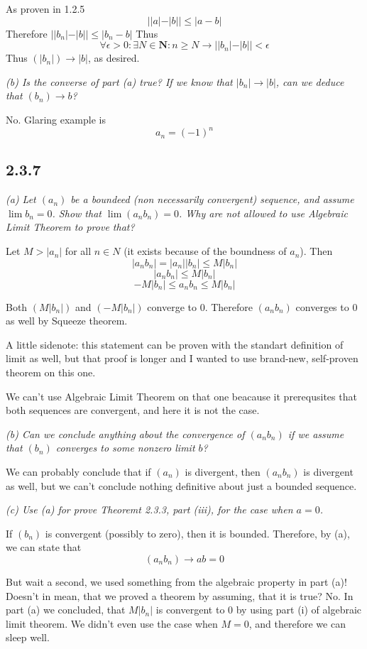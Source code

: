 \documentclass[11pt,oneside,titlepage]{book}
\begin{document}
As proven in 1.2.5
$$||a| - |b|| \leq |a - b|$$
Therefore  $ ||b_n| - |b|| \leq |b_n - b| $
Thus
$$\forall \epsilon > 0: \exists N \in \textbf{N}: n \geq N \to ||b_n| - |b|| < \epsilon$$
Thus $(|b_n|) \to |b|$, as desired.

\textit{(b) Is the converse of part (a) true? If we know that $|b_n| \to |b|$,
  can we deduce that $(b_n) \to b$?}

No. Glaring example is
$$a_n = (-1)^n$$

\subsection*{2.3.7}
\textit{(a) Let $(a_n)$ be a boundeed (non necessarily convergent) sequence,
  and assume $\lim b_n = 0$. Show that $\lim (a_n b_n) = 0$. Why are not
  allowed to use Algebraic Limit Theorem to prove that?}

Let $M > |a_n|$ for all $n \in N$ (it exists because of the boundness of $a_n$).
Then
$$ |a_n b_n| = |a_n||b_n| \leq M |b_n|$$
$$ |a_n b_n| \leq  M |b_n|$$
$$ -M|b_n| \leq a_n b_n \leq  M |b_n|$$

Both $(M|b_n|)$ and $(-M|b_n|)$ converge to 0. Therefore $(a_n b_n)$ converges
to 0 as well by Squeeze theorem.

A little sidenote: this statement can be proven with the standart definition
of limit as well, but that proof is longer and I wanted to use brand-new,
self-proven theorem on this one.

We can't use Algebraic Limit Theorem on that one beacause it prerequsites
that both sequences are convergent, and here it is not the case.

\textit{(b) Can we conclude anything about the convergence of $(a_n b_n)$
  if we assume that $(b_n)$ converges to some nonzero limit $b$?}

We can probably conclude that if $(a_n)$ is divergent, then $(a_n b_n)$ is
divergent as well, but we can't conclude nothing definitive about
just a bounded sequence.

\textit{(c) Use (a) for prove Theoremt 2.3.3, part (iii), for the case when
  $a = 0$.}

If $(b_n)$ is convergent (possibly to zero), then it is bounded.
Therefore, by (a), we can state that
$$(a_n b_n) \to a b = 0$$

But wait a second, we used something from the algebraic property in part (a)!
Doesn't in mean, that we proved a theorem by assuming, that it is true? No.
In part (a) we concluded, that $M|b_n|$ is convergent to 0 by using
part (i) of algebraic limit theorem. We didn't even use the case when
$M = 0$, and therefore we can sleep well.
\end{document}

